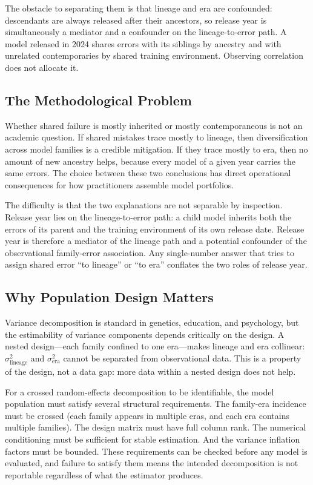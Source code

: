 \documentclass[journal]{IEEEtran}
\begin{document}
The obstacle to separating them is that lineage and era are confounded: descendants are always released after their ancestors, so release year is simultaneously a mediator and a confounder on the lineage-to-error path. A model released in 2024 shares errors with its siblings by ancestry and with unrelated contemporaries by shared training environment. Observing correlation does not allocate it.

\subsection{The Methodological Problem}

Whether shared failure is mostly inherited or mostly contemporaneous is not an academic question. If shared mistakes trace mostly to lineage, then diversification across model families is a credible mitigation. If they trace mostly to era, then no amount of new ancestry helps, because every model of a given year carries the same errors. The choice between these two conclusions has direct operational consequences for how practitioners assemble model portfolios.

The difficulty is that the two explanations are not separable by inspection. Release year lies on the lineage-to-error path: a child model inherits both the errors of its parent and the training environment of its own release date. Release year is therefore a mediator of the lineage path and a potential confounder of the observational family-error association. Any single-number answer that tries to assign shared error ``to lineage'' or ``to era'' conflates the two roles of release year.

\subsection{Why Population Design Matters}

Variance decomposition is standard in genetics, education, and psychology, but the estimability of variance components depends critically on the design. A nested design---each family confined to one era---makes lineage and era collinear: $\sigma^2_{\text{lineage}}$ and $\sigma^2_{\text{era}}$ cannot be separated from observational data. This is a property of the design, not a data gap: more data within a nested design does not help.

For a crossed random-effects decomposition to be identifiable, the model population must satisfy several structural requirements. The family-era incidence must be crossed (each family appears in multiple eras, and each era contains multiple families). The design matrix must have full column rank. The numerical conditioning must be sufficient for stable estimation. And the variance inflation factors must be bounded. These requirements can be checked before any model is evaluated, and failure to satisfy them means the intended decomposition is not reportable regardless of what the estimator produces.
\end{document}
